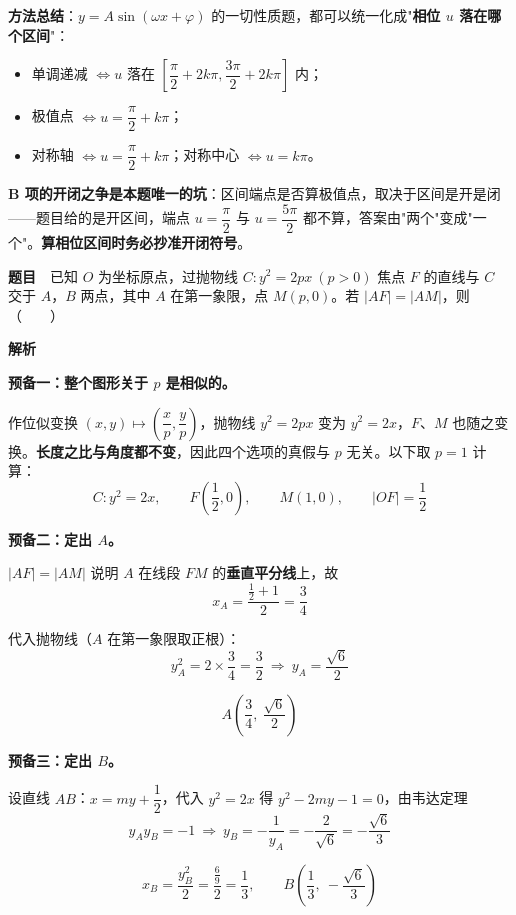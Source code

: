 \begin{gktip}
\textbf{方法总结}：$y=A\sin(\omega x+\varphi)$ 的一切性质题，都可以统一化成"\textbf{相位 $u$ 落在哪个区间}"：
\begin{itemize}
\item 单调递减 $\Leftrightarrow u$ 落在 $\left[\dfrac\pi2+2k\pi,\dfrac{3\pi}2+2k\pi\right]$ 内；
\item 极值点 $\Leftrightarrow u=\dfrac\pi2+k\pi$；
\item 对称轴 $\Leftrightarrow u=\dfrac\pi2+k\pi$；对称中心 $\Leftrightarrow u=k\pi$。
\end{itemize}

\textbf{B 项的开闭之争是本题唯一的坑}：区间端点是否算极值点，取决于区间是开是闭——题目给的是开区间，端点 $u=\dfrac\pi2$ 与 $u=\dfrac{5\pi}2$ 都不算，答案由"两个"变成"一个"。\textbf{算相位区间时务必抄准开闭符号}。
\end{gktip}

\par\medskip


\textbf{题目}　已知 $O$ 为坐标原点，过抛物线 $C:y^{2}=2px\ (p>0)$ 焦点 $F$ 的直线与 $C$ 交于 $A$，$B$ 两点，其中 $A$ 在第一象限，点 $M(p,0)$。若 $|AF|=|AM|$，则（　　）

\textbf{解析}

\textbf{预备一：整个图形关于 $p$ 是相似的。}

作位似变换 $(x,y)\mapsto\left(\dfrac xp,\dfrac yp\right)$，抛物线 $y^{2}=2px$ 变为 $y^{2}=2x$，$F$、$M$ 也随之变换。\textbf{长度之比与角度都不变}，因此四个选项的真假与 $p$ 无关。以下取 $p=1$ 计算：
\[C:y^{2}=2x,\qquad F\left(\frac12,0\right),\qquad M(1,0),\qquad|OF|=\frac12\]

\textbf{预备二：定出 $A$。}

$|AF|=|AM|$ 说明 $A$ 在线段 $FM$ 的\textbf{垂直平分线}上，故
\[x_A=\frac{\frac12+1}2=\frac34\]

代入抛物线（$A$ 在第一象限取正根）：
\[y_A^{2}=2\times\frac34=\frac32\ \Longrightarrow\ y_A=\frac{\sqrt6}2\]

\[A\left(\frac34,\ \frac{\sqrt6}2\right)\]

\textbf{预备三：定出 $B$。}

设直线 $AB$：$x=my+\dfrac12$，代入 $y^{2}=2x$ 得 $y^{2}-2my-1=0$，由韦达定理
\[y_Ay_B=-1\ \Longrightarrow\ y_B=-\frac1{y_A}=-\frac2{\sqrt6}=-\frac{\sqrt6}3\]

\[x_B=\frac{y_B^{2}}2=\frac{\frac69}2=\frac13,\qquad B\left(\frac13,\ -\frac{\sqrt6}3\right)\]

